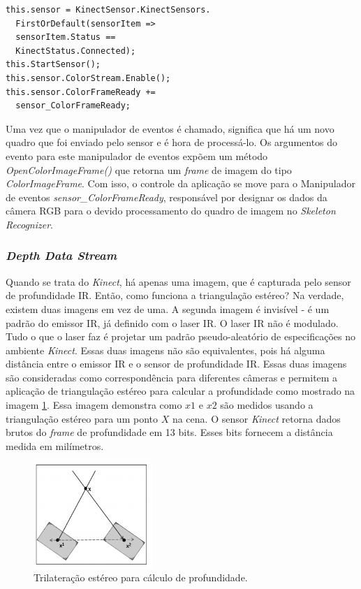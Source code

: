 \begin{verbatim}
this.sensor = KinectSensor.KinectSensors.
  FirstOrDefault(sensorItem => 
  sensorItem.Status == 
  KinectStatus.Connected);
this.StartSensor();
this.sensor.ColorStream.Enable();
this.sensor.ColorFrameReady += 
  sensor_ColorFrameReady;
\end{verbatim}


Uma vez que o manipulador de eventos é chamado, significa que há um novo quadro que foi enviado pelo sensor e é hora de processá-lo. Os argumentos do evento para este manipulador de eventos expõem um método \textit{OpenColorImageFrame()} que retorna um \textit{frame} de imagem do tipo \textit{ColorImageFrame}. Com isso, o controle da aplicação se move para o Manipulador de eventos \textit{sensor\_ColorFrameReady}, responsável por designar os dados da câmera RGB para o devido  processamento do quadro de imagem no \textit{Skeleton Recognizer}. 

\subsubsection{\textit{Depth Data Stream}}\label{sec:depthDataStream}

Quando se trata do \textit{Kinect}, há apenas uma imagem, que é capturada pelo sensor de profundidade IR. Então, como funciona a triangulação estéreo? Na verdade, existem duas imagens em vez de uma. A segunda imagem é invisível - é um padrão do emissor IR, já definido com o laser IR. O laser IR não é modulado. Tudo o que o laser faz é projetar um padrão pseudo-aleatório de especificações no ambiente \textit{Kinect}. Essas duas imagens não são equivalentes, pois há alguma distância entre o emissor IR e o sensor de profundidade IR. Essas duas imagens são consideradas como correspondência para diferentes câmeras e permitem a aplicação de triangulação estéreo para calcular a profundidade como mostrado na imagem \ref{fig:trilatStereo}. Essa imagem demonstra como $x1$ e $x2$ são medidos usando a triangulação estéreo para um ponto $X$ na cena. O sensor \textit{Kinect} retorna dados brutos do \textit{frame} de profundidade em 13 bits. Esses bits fornecem a distância medida em milímetros.

\begin{figure}[!ht]
\centering
\includegraphics[width=0.4\textwidth]{images/trilateracao_estereo.png}
\caption{Trilateração estéreo para cálculo de profundidade.}
\label{fig:trilatStereo}
\end{figure}

